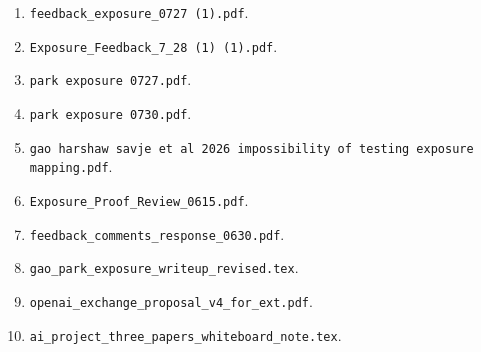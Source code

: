 \documentclass[11pt]{article}
\begin{document}
\begin{enumerate}[leftmargin=2em]
    \item \texttt{feedback\_exposure\_0727 (1).pdf}.
    \item \texttt{Exposure\_Feedback\_7\_28 (1) (1).pdf}.
    \item \texttt{park exposure 0727.pdf}.
    \item \texttt{park exposure 0730.pdf}.
    \item \texttt{gao harshaw savje et al 2026 impossibility of testing exposure
    mapping.pdf}.
    \item \texttt{Exposure\_Proof\_Review\_0615.pdf}.
    \item \texttt{feedback\_comments\_response\_0630.pdf}.
    \item \texttt{gao\_park\_exposure\_writeup\_revised.tex}.
    \item \texttt{openai\_exchange\_proposal\_v4\_for\_ext.pdf}.
    \item \texttt{ai\_project\_three\_papers\_whiteboard\_note.tex}.
\end{enumerate}
\end{document}
